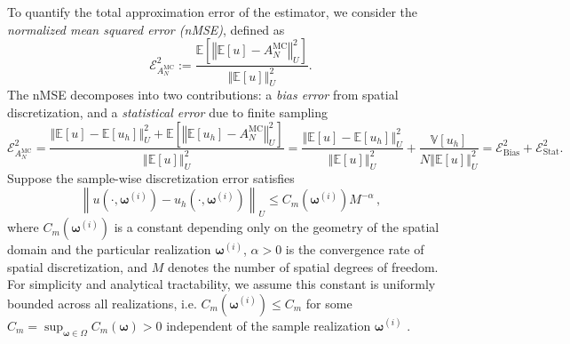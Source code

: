To quantify the total approximation error of the estimator, we consider the  {\it normalized mean squared error (nMSE)}, defined as
%
 \[
\mathcal{E}_{A^{\text{MC}}_{N}}^2:=\frac{\mathbb E\left[\left\Vert\mathbb{E}[u]-A^{\text{MC}}_{N} \right\Vert_{U}^2\right]}{\left\Vert\mathbb{E}[u] \right\Vert_{U}^2}.
\] 
%
The nMSE decomposes into two contributions: a {\it bias error} from spatial discretization, and a {\it statistical error} due to finite sampling
%
\[
\mathcal{E}_{A^{\text{MC}}_{N}}^2 = \frac{\left\Vert\mathbb{E}[u]-\mathbb{E}[u_{h}] \right\Vert_{U}^2+\mathbb E\left[\left\Vert \mathbb{E}[u_{h}] -A^{\text{MC}}_{N} \right\Vert_{U}^2\right]}{\left\Vert\mathbb{E}[u] \right\Vert_{U}^2} 
= \frac{\left\Vert\mathbb{E}[u]-\mathbb{E}[u_{h}] \right\Vert_{U}^2}{\left\Vert\mathbb{E}[u] \right\Vert_{U}^2}+\frac{\mathbb{V}\left[u_{h}\right]}{N\left\Vert\mathbb{E}[u] \right\Vert_{U}^2}
=\mathcal{E}_{\text{Bias}}^2 + \mathcal{E}_{\text{Stat}}^2.
\]
%
Suppose the sample-wise discretization error satisfies
%
\begin{equation*} \label{eq:Assumption_uhA}
\left\|u\left(\cdot, \boldsymbol\omega^{(i)}\right)-u_h\left(\cdot,\boldsymbol\omega^{(i)}\right)\right\|_U\leq C_m\left(\boldsymbol\omega^{(i)}\right)M^{-\alpha}\,,
\end{equation*}
%
where $C_m(\boldsymbol\omega^{(i)})$ is a constant depending only on the geometry of the spatial domain and the particular realization $\boldsymbol\omega^{(i)}$, $\alpha>0$ is the convergence rate of spatial discretization, and $M$ denotes the number of spatial degrees of freedom. For simplicity and analytical tractability, we assume this constant is uniformly bounded across all realizations, i.e. $C_m(\boldsymbol\omega^{(i)})\le C_m$ for some $C_m=\sup_{\boldsymbol{\omega} \in \Omega} C_m(\boldsymbol{\omega})>0$ independent of the sample realization $\boldsymbol\omega^{(i)}$ \cite{BaNoTe:2007,BaScZo:2011}.


